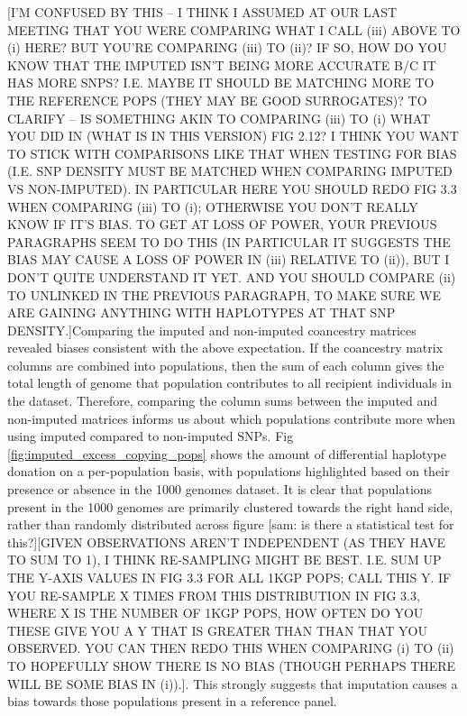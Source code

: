 {{\color{red}[I'M CONFUSED BY THIS -- I THINK I ASSUMED AT OUR LAST MEETING THAT YOU WERE COMPARING WHAT I CALL (iii) ABOVE TO (i) HERE? BUT YOU'RE COMPARING (iii) TO (ii)? IF SO, HOW DO YOU KNOW THAT THE IMPUTED ISN'T BEING MORE ACCURATE B/C IT HAS MORE SNPS? I.E. MAYBE IT SHOULD BE MATCHING MORE TO THE REFERENCE POPS (THEY MAY BE GOOD SURROGATES)? TO CLARIFY -- IS SOMETHING AKIN TO COMPARING (iii) TO (i) WHAT YOU DID IN (WHAT IS IN THIS VERSION) FIG 2.12? I THINK YOU WANT TO STICK WITH COMPARISONS LIKE THAT WHEN TESTING FOR BIAS (I.E. SNP DENSITY MUST BE MATCHED WHEN COMPARING IMPUTED VS NON-IMPUTED). IN PARTICULAR HERE YOU SHOULD REDO FIG 3.3 WHEN COMPARING (iii) TO (i); OTHERWISE YOU DON'T REALLY KNOW IF IT'S BIAS. TO GET AT LOSS OF POWER, YOUR PREVIOUS PARAGRAPHS SEEM TO DO THIS (IN PARTICULAR IT SUGGESTS THE BIAS MAY CAUSE A LOSS OF POWER IN (iii) RELATIVE TO (ii)), BUT I DON'T QUITE UNDERSTAND IT YET. AND YOU SHOULD COMPARE (ii) TO UNLINKED IN THE PREVIOUS PARAGRAPH, TO MAKE SURE WE ARE GAINING ANYTHING WITH HAPLOTYPES AT THAT SNP DENSITY.]}Comparing the imputed and non-imputed coancestry matrices revealed biases consistent with the above expectation. If the coancestry matrix columns are combined into populations, then the sum of each column gives the total length of genome that population contributes to all recipient individuals in the dataset. Therefore, comparing the column sums between the imputed and non-imputed matrices informs us about which populations contribute more when using imputed compared to non-imputed SNPs. Fig \ref{fig:imputed_excess_copying_pops} shows the amount of differential haplotype donation on a per-population basis, with populations highlighted based on their presence or absence in the 1000 genomes dataset. It is clear that populations present in the 1000 genomes are primarily clustered towards the right hand side, rather than randomly distributed across figure [sam: is there a statistical test for this?]{\color{red}[GIVEN OBSERVATIONS AREN'T INDEPENDENT (AS THEY HAVE TO SUM TO 1), I THINK RE-SAMPLING MIGHT BE BEST. I.E. SUM UP THE Y-AXIS VALUES IN FIG 3.3 FOR ALL 1KGP POPS; CALL THIS Y. IF YOU RE-SAMPLE X TIMES FROM THIS DISTRIBUTION IN FIG 3.3, WHERE X IS THE NUMBER OF 1KGP POPS, HOW OFTEN DO YOU THESE GIVE YOU A Y THAT IS GREATER THAN THAN THAT YOU OBSERVED. YOU CAN THEN REDO THIS WHEN COMPARING (i) TO (ii) TO HOPEFULLY SHOW THERE IS NO BIAS (THOUGH PERHAPS THERE WILL BE SOME BIAS IN (i)).]}. This strongly suggests that imputation causes a bias towards those populations present in a reference panel. 

}
